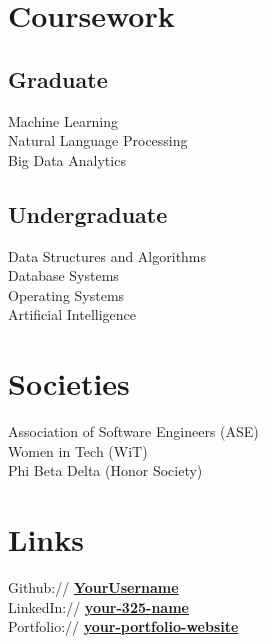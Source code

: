 \documentclass[]{deedy-resume-multilatex}
\begin{document}
\begin{minipage}[t]{0.33\textwidth}

\section{Coursework}
\subsection{Graduate}
Machine Learning \\
Natural Language Processing \\
Big Data Analytics \\
\sectionsep

\subsection{Undergraduate}
Data Structures and Algorithms \\
Database Systems \\
Operating Systems \\
Artificial Intelligence \\
\sectionsep


\section{Societies}
Association of Software Engineers (ASE)\\
Women in Tech (WiT)\\
Phi Beta Delta (Honor Society)\\
\sectionsep


\section{Links}
Github:// \href{https://github.com/YourUsername}{\bf YourUsername} \\
LinkedIn://  \href{https://www.linkedin.com/in/your-325-name}{\bf your-325-name} \\
Portfolio:// \href{https://your-portfolio-website.com}{\bf your-portfolio-website}
\sectionsep

\end{minipage}
\end{document}
